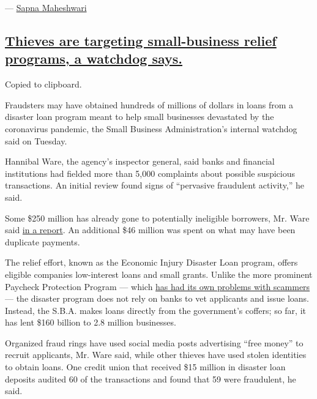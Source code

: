 --- \href{https://www.nytimes.com/by/sapna-maheshwari}{Sapna Maheshwari}

\hypertarget{thieves-are-targeting-small-business-relief-programs-a-watchdog-says}{%
\subsection{\texorpdfstring{\protect\hyperlink{thieves-are-targeting-small-business-relief-programs-a-watchdog-says}{Thieves
are targeting small-business relief programs, a watchdog
says.}}{Thieves are targeting small-business relief programs, a watchdog says.}}\label{thieves-are-targeting-small-business-relief-programs-a-watchdog-says}}

Copied to clipboard.

Fraudsters may have obtained hundreds of millions of dollars in loans
from a disaster loan program meant to help small businesses devastated
by the coronavirus pandemic, the Small Business Administration's
internal watchdog said on Tuesday.

Hannibal Ware, the agency's inspector general, said banks and financial
institutions had fielded more than 5,000 complaints about possible
suspicious transactions. An initial review found signs of ``pervasive
fraudulent activity,'' he said.

Some \$250 million has already gone to potentially ineligible borrowers,
Mr. Ware said
\href{https://int.nyt.com/data/documenttools/sba-inspector-general-report-on-eidl-fraud-concerns/dc62cc6f7385acef/full.pdf}{in
a report}. An additional \$46 million was spent on what may have been
duplicate payments.

The relief effort, known as the Economic Injury Disaster Loan program,
offers eligible companies low-interest loans and small grants. Unlike
the more prominent Paycheck Protection Program --- which
\href{https://www.nytimes.com/2020/07/27/us/lamborghini-ppp-covid-19.html}{has
had its own problems with scammers} --- the disaster program does not
rely on banks to vet applicants and issue loans. Instead, the S.B.A.
makes loans directly from the government's coffers; so far, it has lent
\$160 billion to 2.8 million businesses.

Organized fraud rings have used social media posts advertising ``free
money'' to recruit applicants, Mr. Ware said, while other thieves have
used stolen identities to obtain loans. One credit union that received
\$15 million in disaster loan deposits audited 60 of the transactions
and found that 59 were fraudulent, he said.

